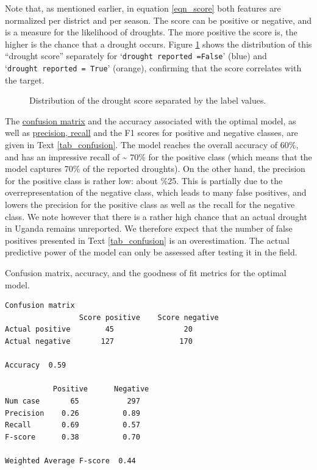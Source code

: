 \documentclass[10pt,parskip=half,
toc=sectionentrywithdots,
bibliography=totocnumbered,
captions=tableheading,numbers=noendperiod]{scrartcl}
\begin{document}
Note that, as mentioned earlier, in equation \ref{eqn_score} both
features are normalized per district and per season. The score can be
positive or negative, and is a measure for the likelihood of droughts.
The more positive the score is, the higher is the chance that a drought
occurs. Figure \ref{fig_score} shows the distribution of this ``drought
score'' separately for `\texttt{drought\ reported\ =False}' (blue) and
`\texttt{drought\ reported\ =\ True}' (orange), confirming that the
score correlates with the target.

\begin{figure}[H]\begin{center}\end{center}\caption{Distribution of the drought score separated by the label values.}\label{fig_score}\end{figure}

The \href{https://en.wikipedia.org/wiki/Confusion_matrix}{confusion
matrix} and the accuracy associated with the optimal model, as well as
\href{https://en.wikipedia.org/wiki/Precision_and_recall}{precision,
recall} and the F1 scores for positive and negative classes, are given
in Text \ref{tab_confusion}. The model reaches the overall accuracy of
60\%, and has an impressive recall of \textasciitilde{} 70\% for the
positive class (which means that the model captures 70\% of the reported
droughts). On the other hand, the precision for the positive class is
rather low: about \%25. This is partially due to the overrepresentation
of the negative class, which leads to many false positives, and lowers
the precision for the positive class as well as the recall for the
negative class. We note however that there is a rather high chance that
an actual drought in Uganda remains unreported. We therefore expect that
the number of false positives presented in Text \ref{tab_confusion} is
an overestimation. The actual predictive power of the model can only be
assessed after testing it in the field.

\begin{textcell}[H]
\caption{Confusion matrix, accuracy, and the goodness of fit metrics for the
optimal model.}
\label{tab_confusion}
\begin{lstlisting}[aboveskip=5pt,basicstyle=\small,belowskip=5pt,breakindent=0pt,language={},numbers=none,postbreak={},xrightmargin=7pt]
                 Confusion matrix
                 Score positive    Score negative
Actual positive        45                20
Actual negative       127               170

Accuracy  0.59

           Positive      Negative
Num case       65           297
Precision    0.26          0.89
Recall       0.69          0.57
F-score      0.38          0.70

Weighted Average F-score  0.44

\end{lstlisting}\end{textcell}
\end{document}
